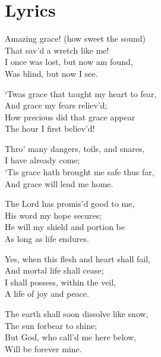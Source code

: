 \documentclass[10pt,a4paper,oneside,twocolumn]{book}
\begin{document}
\section{Lyrics}
\begin{flushleft}
Amazing grace! (how sweet the sound)\\
That sav'd a wretch like me!\\
I once was lost, but now am found,\\
Was blind, but now I see.
\medskip

`Twas grace that taught my heart to fear,\\
And grace my fears reliev'd;\\
How precious did that grace appear\\
The hour I first believ'd!
\medskip

Thro' many dangers, toils, and snares,\\
I have already come;\\
`Tis grace hath brought me safe thus far,\\
And grace will lead me home.
\medskip

The Lord has promis'd good to me,\\
His word my hope secures;\\
He will my shield and portion be\\
As long as life endures.
\medskip

Yes, when this flesh and heart shall fail,\\
And mortal life shall cease;\\
I shall possess, within the veil,\\
A life of joy and peace.
\medskip

The earth shall soon dissolve like snow,\\
The sun forbear to shine;\\
But God, who call'd me here below,\\
Will be forever mine.
\end{flushleft}
\end{document}
